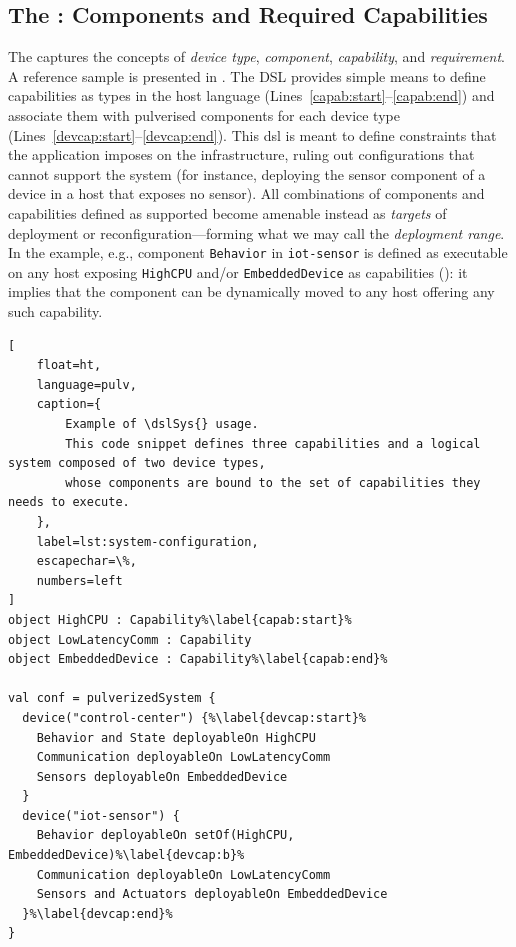 \documentclass[conference]{IEEEtran}
\begin{document}
\subsection{The \dslSys{}: Components and Required Capabilities}
\label{sec:contrib:dslsys}

The \dslSys{} captures the concepts of
\emph{device type}, \emph{component}, \emph{capability}, and \emph{requirement}.
%
A reference sample is presented in .
%
The DSL provides simple means to define capabilities as types in the host language (Lines~\ref{capab:start}--\ref{capab:end})
and associate them with pulverised components for each device type (Lines~\ref{devcap:start}--\ref{devcap:end}).
%
This \ac{dsl} is meant to define constraints that the application imposes on the infrastructure,
ruling out configurations that cannot support the system
(for instance, deploying the sensor component of a device in a host that exposes no sensor).
%
All combinations of components and capabilities defined as supported become amenable instead as \emph{targets} of deployment or reconfiguration---forming what we may call the \emph{deployment range}.
%
In the example, e.g., component \texttt{Behavior} in \texttt{iot-sensor} is defined as executable on any host exposing
\texttt{HighCPU} and/or \texttt{EmbeddedDevice} as capabilities ():
it implies that the component can be dynamically moved to any host offering any such capability.

%

\begin{lstlisting}[
    float=ht,
    language=pulv,
    caption={
        Example of \dslSys{} usage.
        This code snippet defines three capabilities and a logical system composed of two device types,
        whose components are bound to the set of capabilities they needs to execute.
    },
    label=lst:system-configuration,
    escapechar=\%,
    numbers=left
]
object HighCPU : Capability%\label{capab:start}%
object LowLatencyComm : Capability
object EmbeddedDevice : Capability%\label{capab:end}%

val conf = pulverizedSystem {
  device("control-center") {%\label{devcap:start}%
    Behavior and State deployableOn HighCPU
    Communication deployableOn LowLatencyComm
    Sensors deployableOn EmbeddedDevice
  }
  device("iot-sensor") {
    Behavior deployableOn setOf(HighCPU, EmbeddedDevice)%\label{devcap:b}%
    Communication deployableOn LowLatencyComm
    Sensors and Actuators deployableOn EmbeddedDevice
  }%\label{devcap:end}%
}
\end{lstlisting}
\end{document}
